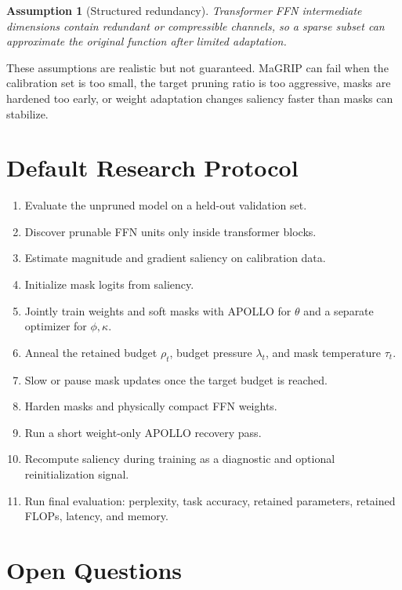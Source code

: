\documentclass[11pt]{article}
\newtheorem{assumption}{Assumption}
\begin{document}
\begin{assumption}[Structured redundancy]
Transformer FFN intermediate dimensions contain redundant or compressible channels, so a sparse subset can approximate the original function after limited adaptation.
\end{assumption}

These assumptions are realistic but not guaranteed. MaGRIP can fail when the calibration set is too small, the target pruning ratio is too aggressive, masks are hardened too early, or weight adaptation changes saliency faster than masks can stabilize.

\section{Default Research Protocol}

\begin{enumerate}[leftmargin=*]
  \item Evaluate the unpruned model on a held-out validation set.
  \item Discover prunable FFN units only inside transformer blocks.
  \item Estimate magnitude and gradient saliency on calibration data.
  \item Initialize mask logits from saliency.
  \item Jointly train weights and soft masks with APOLLO for $\theta$ and a separate optimizer for $\phi,\kappa$.
  \item Anneal the retained budget $\rho_t$, budget pressure $\lambda_t$, and mask temperature $\tau_t$.
  \item Slow or pause mask updates once the target budget is reached.
  \item Harden masks and physically compact FFN weights.
  \item Run a short weight-only APOLLO recovery pass.
  \item Recompute saliency during training as a diagnostic and optional reinitialization signal.
  \item Run final evaluation: perplexity, task accuracy, retained parameters, retained FLOPs, latency, and memory.
\end{enumerate}

\section{Open Questions}
\end{document}
